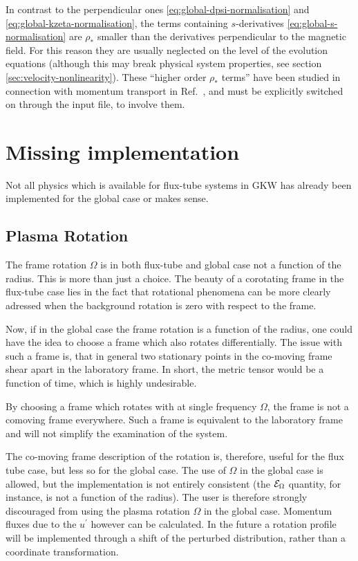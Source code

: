 In contrast to the perpendicular ones \eqref{eq:global-dpsi-normalisation} and \eqref{eq:global-kzeta-normalisation}, the terms containing
$s$-derivatives \eqref{eq:global-s-normalisation} are $\rho_*$ smaller than the derivatives
perpendicular to the magnetic field.
For this reason they are usually neglected on the level of the evolution equations (although this may break physical system properties, see section \ref{sec:velocity-nonlinearity}).
These ``higher order $\rho_*$ terms''  have been studied in connection with momentum transport in Ref.~\cite{SUN13}, and must be explicitly switched on through the input file, to involve them.

\section{Missing implementation}
\label{sec:global-missing}

Not all physics which is available for flux-tube systems in GKW has already been implemented for the global case or makes sense.

\subsection*{Plasma Rotation}
\label{sec:global-plasma-rotation}

The frame rotation $\Omega$ is in both flux-tube and global case not a function of the radius. 
This is more than just a choice. 
The beauty of a corotating frame in the flux-tube case lies in the fact that rotational 
phenomena can be more clearly adressed when the background rotation is zero with respect to the frame.

Now, if in the global case the frame rotation is a function of the radius, one could have the idea to choose a frame which also rotates differentially.
The issue with such a frame is, that in general two stationary points in the co-moving frame 
shear apart in the laboratory frame. 
In short, the metric tensor would be a function of time, which is highly undesirable.

By choosing a frame which rotates with at single frequency $\Omega$, the frame is not a comoving frame everywhere.
Such a frame is equivalent to the laboratory frame and will not simplify the examination of the system.

The co-moving frame description of the rotation is, therefore, useful for the flux tube case, but less so 
for the global case. 
The use of $\Omega$ in the global case is allowed, but the implementation is not entirely consistent (the 
${\cal E}_\Omega$ quantity, for instance, is not a function of the radius). 
The user is therefore strongly discouraged from using the plasma rotation $\Omega$ in the global case. 
Momentum fluxes due to the $u^\prime$ however can be calculated. 
In the future a rotation profile will be implemented through a shift of the perturbed distribution, rather than 
a coordinate transformation. 


